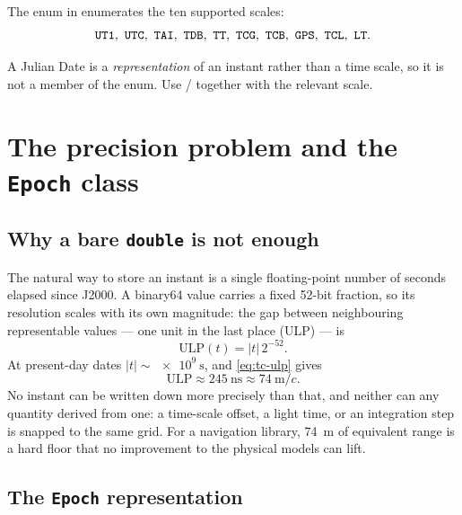 The  enum in  enumerates the ten
supported scales:
%
\begin{equation*}
  \code{UT1},\ \code{UTC},\ \code{TAI},\ \code{TDB},\ \code{TT},\
  \code{TCG},\ \code{TCB},\ \code{GPS},\ \code{TCL},\ \code{LT}.
\end{equation*}

\begin{lupntnote}
A Julian Date is a \emph{representation} of an instant rather than a time
scale, so it is not a member of the enum. Use \cpp{JdToTime} / 
together with the relevant scale.
\end{lupntnote}

\section{The precision problem and the \texttt{Epoch} class}
\label{sec:tc-epoch}

\subsection{Why a bare \texttt{double} is not enough}

The natural way to store an instant is a single floating-point number of
seconds elapsed since J2000. A binary64 value \citep{ieee754} carries a fixed
52-bit fraction, so its resolution scales with its own magnitude: the gap
between neighbouring representable values --- one unit in the last place (ULP)
--- is
%
\begin{equation}
\label{eq:tc-ulp}
  \mathrm{ULP}(t) = |t|\,2^{-52} .
\end{equation}
%
At present-day dates $|t| \sim \SI{e9}{\second}$, and \cref{eq:tc-ulp} gives
%
\begin{equation}
\label{eq:tc-ulp-value}
  \mathrm{ULP} \approx \SI{245}{\nano\second} \approx \SI{74}{\meter}/c .
\end{equation}
%
No instant can be written down more precisely than that, and neither can any
quantity derived from one: a time-scale offset, a light time, or an
integration step is snapped to the same grid. For a navigation library,
\SI{74}{\meter} of equivalent range is a hard floor that no improvement to the
physical models can lift.

\subsection{The \texttt{Epoch} representation}

